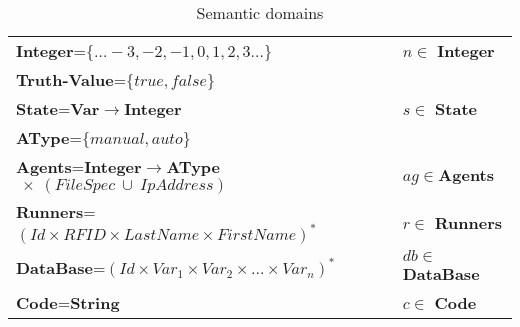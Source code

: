 \documentclass[preprint, prX]{revtex4}
\begin{document}
\begin{table}[htb]        \caption{Semantic domains}
\label{tab:Y}
\footnotesize
\vspace{-5mm}
\begin{center}
\begin{tabular}{ | l  l | }
\hline
  \textbf{Integer}=$\{\ldots -3,-2,-1,0,1,2,3 \ldots\}$ & $n \in$ \textbf{Integer} \\
  \textbf{Truth-Value}=$\{true,false\}$ &  \\
  \textbf{State}=\textbf{Var}$\rightarrow$\textbf{Integer} & $s \in$ \textbf{State} \\
  \textbf{AType}=$\{manual,auto\}$ &  \\
  \textbf{Agents}=\textbf{Integer}$\rightarrow$\textbf{AType}$\ \times\ (FileSpec\ \cup\ IpAddress)$ & $ag \in$\textbf{Agents} \\
  \textbf{Runners}=$(Id \times RFID \times LastName \times FirstName)^{*}$ & $r \in $ \textbf{Runners}\\
  \textbf{DataBase}=$(Id \times Var_{1} \times Var_{2} \times \ldots \times Var_{n})^{*}$ & $db \in $ \textbf{DataBase}\\
  \textbf{Code}=\textbf{String} & $c \in $ \textbf{Code} \\
\hline
\end{tabular}
\end{center}
\normalsize
\vspace{-5mm}
\end{table}
\end{document}
